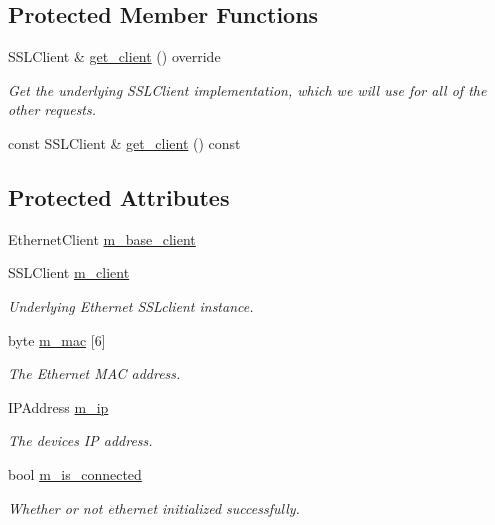 \subsection*{Protected Member Functions}
\begin{DoxyCompactItemize}
\item 
S\+S\+L\+Client \& \hyperlink{class_loom___ethernet_a8152295e24d6bbd8f5b9cda6cccc0997}{get\+\_\+client} () override
\begin{DoxyCompactList}\small\item\em Get the underlying S\+S\+L\+Client implementation, which we will use for all of the other requests. \end{DoxyCompactList}\item 
const S\+S\+L\+Client \& \hyperlink{class_loom___ethernet_a9223a4328f34b0a6640e1183e1f8ed2c}{get\+\_\+client} () const 
\end{DoxyCompactItemize}
\subsection*{Protected Attributes}
\begin{DoxyCompactItemize}
\item 
Ethernet\+Client \hyperlink{class_loom___ethernet_a9d0214994b52ec9932906ccfb5593a9d}{m\+\_\+base\+\_\+client}
\item 
S\+S\+L\+Client \hyperlink{class_loom___ethernet_ade9af6aab7a240375cc4f4786b8b0b04}{m\+\_\+client}
\begin{DoxyCompactList}\small\item\em Underlying Ethernet S\+S\+Lclient instance. \end{DoxyCompactList}\item 
byte \hyperlink{class_loom___ethernet_ad3ac39aaf45c0c53965d029e9c1db7a4}{m\+\_\+mac} \mbox{[}6\mbox{]}
\begin{DoxyCompactList}\small\item\em The Ethernet M\+AC address. \end{DoxyCompactList}\item 
I\+P\+Address \hyperlink{class_loom___ethernet_ab7b3e7573fa75b43d99d99cec21b6a86}{m\+\_\+ip}
\begin{DoxyCompactList}\small\item\em The devices IP address. \end{DoxyCompactList}\item 
bool \hyperlink{class_loom___ethernet_a383b518b130bb1342bd8e4eae8c01e29}{m\+\_\+is\+\_\+connected}
\begin{DoxyCompactList}\small\item\em Whether or not ethernet initialized successfully. \end{DoxyCompactList}\end{DoxyCompactItemize}

